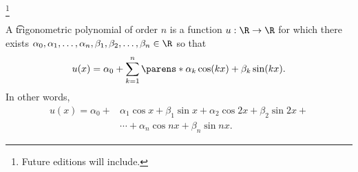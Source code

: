 
\footnote{Future editions will include.}


A \t{trigonometric polynomial} of order $n$ is a function $u: \R \to \R$ for which there exists $\alpha_0, \alpha_1, \dots, \alpha_n, \beta_1, \beta_2, \dots, \beta_n \in \R$ so that
\[
	u(x) = \alpha_0 + \sum_{k = 1}^{n} \parens*{\alpha_k \cos(kx) + \beta_k \sin(kx)}.
\]
In other words,
\[
\begin{aligned}
  u(x) = \alpha_0 +& \alpha_1\cos x + \beta_1\sin x + \alpha_2 \cos2x + \beta_2 \sin2x + \\ &\cdots + \alpha_n \cos nx + \beta_n \sin nx.
\end{aligned}
\]


\blankpage
